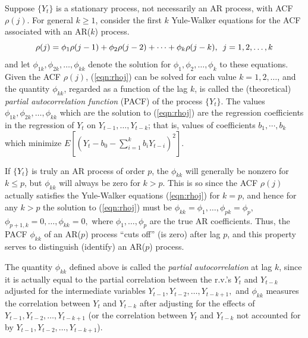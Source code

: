 Suppose $\{Y_t\}$ is a stationary process, not necessarily an AR process, with ACF $\rho(j)$. For general $k \geq 1$, consider the first $k$ Yule-Walker equations for the ACF associated with an AR($k$) process.
	\begin{equation}\label{eqn:rhoj}
	\rho(j) = \phi_1\rho(j-1) + \phi_2\rho(j-2) + \cdots + \phi_k\rho(j-k),\enskip j = 1, 2,\ldots, k
	\end{equation}
and let $\phi_{1k},\phi_{2k},\ldots,\phi_{kk}$ denote the solution for $\phi_1,\phi_2,\ldots,\phi_k$ to these equations. Given the ACF $\rho(j)$, (\ref{eqn:rhoj}) can be solved for each value $k= 1,2,\ldots$, and the quantity $\phi_{kk}$, regarded as a function of the lag $k$, is called the (theoretical) \textit{partial autocorrelation function} (PACF) of the process $\{Y_t\}$. The values $\phi_{1k}, \phi_{2k},\ldots, \phi_{kk}$ which are the solution to (\ref{eqn:rhoj}) are the regression coefficients in the regression of $Y_t$ on $Y_{t-1},\ldots,Y_{t-k}$; that is, values of coefficients $b_1,\cdots,b_k$ which minimize $E[(Y_t - b_0 - \sum_{i=1}^k b_iY_{t-i})^2]$.


If $\{Y_t\}$ is truly an AR process of order $p$, the $\phi_{kk}$ will generally be nonzero for $k \leq p$, but $\phi_{kk}$ will always be zero for $k>p$. This is so since the ACF $\rho(j)$ actually satisfies the Yule-Walker equations (\ref{eqn:rhoj}) for $k=p$, and hence for any $k>p$ the solution to (\ref{eqn:rhoj}) must be $\phi_{kk}= \phi_1,\ldots, \phi_{pk}= \phi_p$, $\phi_{p+1,k} = 0,\ldots,\phi_{kk} = 0,$ where $\phi_1,\ldots,\phi_p$ are the true AR coefficients. Thus, the PACF $\phi_{kk}$ of an AR($p$) process ``cuts off'' (is zero) after lag $p$, and this property serves to distinguish (identify) an AR($p$) process.


The quantity $\phi_{kk}$ defined above is called the \textit{partial autocorrelation} at lag $k$, since it is actually equal to the partial correlation between the r.v.'s $Y_t$ and $Y_{t-k}$ adjusted for the intermediate variables $Y_{t-1}, Y_{t-2},\ldots,Y_{t-k+1},$ and $\phi_{kk}$ measures the correlation between $Y_t$ and $Y_{t-k}$ after adjusting for the effects of $Y_{t-1}, Y_{t-2},\ldots,Y_{t-k+1}$ (or the correlation between $Y_t$ and $Y_{t-k}$ not accounted for by $Y_{t-1}, Y_{t-2},\ldots,Y_{t-k+1}$). 


